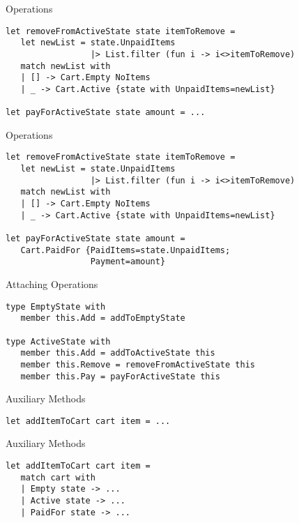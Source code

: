 \documentclass{beamer}
\begin{document}
\begin{frame}[fragile]{Operations}
  \begin{center}  \end{center}
  \begin{verbatim}
let removeFromActiveState state itemToRemove =
   let newList = state.UnpaidItems
                 |> List.filter (fun i -> i<>itemToRemove)
   match newList with
   | [] -> Cart.Empty NoItems
   | _ -> Cart.Active {state with UnpaidItems=newList}

let payForActiveState state amount = ...
  \end{verbatim}
\end{frame}

\begin{frame}[fragile]{Operations}
  \begin{center}  \end{center}
  \begin{verbatim}
let removeFromActiveState state itemToRemove =
   let newList = state.UnpaidItems
                 |> List.filter (fun i -> i<>itemToRemove)
   match newList with
   | [] -> Cart.Empty NoItems
   | _ -> Cart.Active {state with UnpaidItems=newList}

let payForActiveState state amount =
   Cart.PaidFor {PaidItems=state.UnpaidItems;
                 Payment=amount}
  \end{verbatim}
\end{frame}

\begin{frame}[fragile]{Attaching Operations}
  \begin{center}  \end{center}
  \begin{verbatim}
type EmptyState with
   member this.Add = addToEmptyState

type ActiveState with
   member this.Add = addToActiveState this
   member this.Remove = removeFromActiveState this
   member this.Pay = payForActiveState this
  \end{verbatim}
\end{frame}

\begin{frame}[fragile]{Auxiliary Methods}
  \begin{verbatim}
let addItemToCart cart item = ...
  \end{verbatim}
\end{frame}

\begin{frame}[fragile]{Auxiliary Methods}
  \begin{verbatim}
let addItemToCart cart item =
   match cart with
   | Empty state -> ...
   | Active state -> ...
   | PaidFor state -> ...
  \end{verbatim}
\end{frame}
\end{document}
